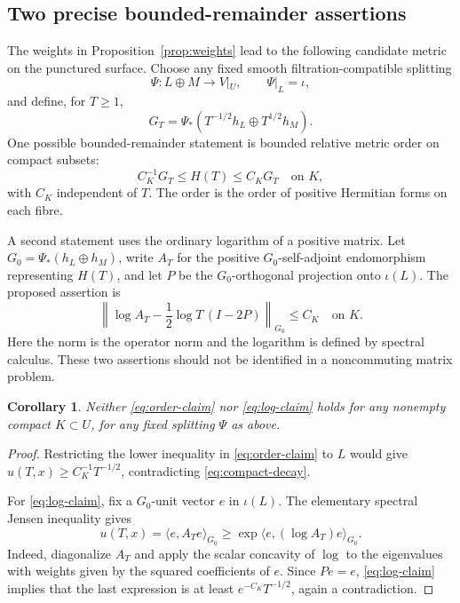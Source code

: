\documentclass[11pt]{amsart}
\newtheorem{corollary}[theorem]{Corollary}
\theoremstyle{definition}
\theoremstyle{remark}
\begin{document}
\subsection{Two precise bounded-remainder assertions}
The weights in Proposition~\ref{prop:weights} lead to the following
candidate metric on the punctured surface. Choose any fixed smooth
filtration-compatible splitting
\[
 \Psi:L\oplus M\longrightarrow V|_U,
 \qquad \Psi|_L=\iota,
\]
and define, for $T\ge1$,
\begin{equation}\label{eq:model}
 G_T=\Psi_*(T^{-1/2}h_L\oplus T^{1/2}h_M).
\end{equation}
One possible bounded-remainder statement is bounded relative metric
order on compact subsets:
\begin{equation}\label{eq:order-claim}
 C_K^{-1}G_T\le H(T)\le C_KG_T\quad\text{on }K,
\end{equation}
with $C_K$ independent of $T$. The order is the order of positive
Hermitian forms on each fibre.

A second statement uses the ordinary logarithm of a positive matrix.
Let $G_0=\Psi_*(h_L\oplus h_M)$, write $A_T$ for the positive
$G_0$-self-adjoint endomorphism representing $H(T)$, and let $P$ be the
$G_0$-orthogonal projection onto $\iota(L)$. The proposed assertion is
\begin{equation}\label{eq:log-claim}
 \left\|\log A_T-\frac12\log T\,(I-2P)\right\|_{G_0}\le C_K
 \quad\text{on }K.
\end{equation}
Here the norm is the operator norm and the logarithm is defined by
spectral calculus. These two assertions should not be identified in a
noncommuting matrix problem.

\begin{corollary}\label{cor:two-obstructions}
Neither \eqref{eq:order-claim} nor \eqref{eq:log-claim} holds for any
nonempty compact $K\subset U$, for any fixed splitting $\Psi$ as above.
\end{corollary}

\begin{proof}
Restricting the lower inequality in \eqref{eq:order-claim} to $L$
would give $u(T,x)\ge C_K^{-1}T^{-1/2}$, contradicting
\eqref{eq:compact-decay}.

For \eqref{eq:log-claim}, fix a $G_0$-unit vector $e$ in $\iota(L)$.
The elementary spectral Jensen inequality gives
\begin{equation}\label{eq:jensen}
 u(T,x)=\langle e,A_Te\rangle_{G_0}
 \ge \exp\langle e,(\log A_T)e\rangle_{G_0}.
\end{equation}
Indeed, diagonalize $A_T$ and apply the scalar concavity of $\log$ to
the eigenvalues with weights given by the squared coefficients of $e$.
Since $Pe=e$, \eqref{eq:log-claim} implies that the last expression
is at least $e^{-C_K}T^{-1/2}$, again a contradiction.
\end{proof}
\end{document}
